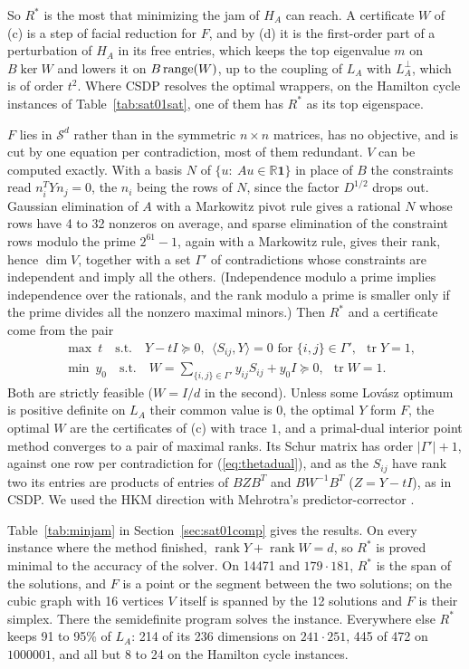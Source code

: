 \documentclass[11pt]{article}
\theoremstyle{definition}
\theoremstyle{remark}
\newcommand{\R}{\mathbb{R}}
\newcommand{\one}{\mathbf{1}}
\DeclareMathOperator{\tr}{tr}
\DeclareMathOperator{\rank}{rank}
\begin{document}
So $R^*$ is the most that minimizing the jam of $H_A$ can reach. A
certificate $W$ of (c) is a step of facial reduction \cite{BW81} for $F$,
and by (d) it is the first-order part of a perturbation of $H_A$ in its
free entries, which keeps the top eigenvalue $m$ on $B\ker W$ and lowers it
on $B\,{\rm range}(W)$, up to the coupling of $L_A$ with $L_A^\perp$, which
is of order $t^2$. Where CSDP resolves the optimal wrappers, on the
Hamilton cycle instances of Table~\ref{tab:sat01sat}, one of them has $R^*$
as its top eigenspace.

$F$ lies in $\mathcal S^d$ rather than in the symmetric $n\times n$
matrices, has no objective, and is cut by one equation per contradiction,
most of them redundant. $V$ can be computed exactly. With a basis $N$ of
$\{u:\ Au\in\R\one\}$ in place of $B$ the constraints read $n_i^TYn_j=0$,
the $n_i$ being the rows of $N$, since the factor $D^{1/2}$ drops out.
Gaussian elimination of $A$ with a Markowitz pivot rule gives a rational $N$
whose rows have 4 to 32 nonzeros on average, and sparse elimination of the
constraint rows modulo the prime $2^{61}-1$, again with a Markowitz rule,
gives their rank, hence $\dim V$, together with a set $\Gamma'$ of
contradictions whose constraints are independent and imply all the others.
(Independence modulo a prime implies independence over the rationals, and
the rank modulo a prime is smaller only if the prime divides all the
nonzero maximal minors.) Then $R^*$ and a certificate come from the pair
\begin{align*}
&\max\ t\quad\mbox{s.t.}\quad Y-tI\succeq0,\ \ \langle S_{ij},Y\rangle=0
  \mbox{ for } \{i,j\}\in\Gamma',\ \ \tr Y=1,\\
&\min\ y_0\quad\mbox{s.t.}\quad W=\sum_{\{i,j\}\in\Gamma'}y_{ij}S_{ij}
  +y_0I\succeq0,\ \ \tr W=1.
\end{align*}
Both are strictly feasible ($W=I/d$ in the second). Unless some Lov\'asz
optimum is positive definite on $L_A$ their common value is $0$, the optimal
$Y$ form $F$, the optimal $W$ are the certificates of (c) with trace $1$, and
a primal-dual interior point method converges to a pair of maximal ranks.
Its Schur matrix has order $|\Gamma'|+1$, against one row per contradiction
for (\ref{eq:thetadual}), and as the $S_{ij}$ have rank two its entries are
products of entries of $BZB^T$ and $BW^{-1}B^T$ ($Z=Y-tI$), as in CSDP. We
used the HKM direction \cite{HRVW96} with Mehrotra's predictor-corrector
\cite{Me92}.

Table~\ref{tab:minjam} in Section~\ref{sec:sat01comp} gives the results. On
every instance where the method finished, $\rank Y+\rank W=d$, so $R^*$ is
proved minimal to the accuracy of the solver. On 14471 and $179\cdot181$,
$R^*$ is the span of the solutions, and $F$ is a point or the segment
between the two solutions; on the cubic graph with 16 vertices $V$ itself
is spanned by the 12 solutions and $F$ is their simplex. There the
semidefinite program solves the instance. Everywhere else $R^*$ keeps 91 to
95\% of $L_A$: 214 of its 236 dimensions on $241\cdot251$, 445 of 472 on
$1000001$, and all but 8 to 24 on the Hamilton cycle instances.
\end{document}
